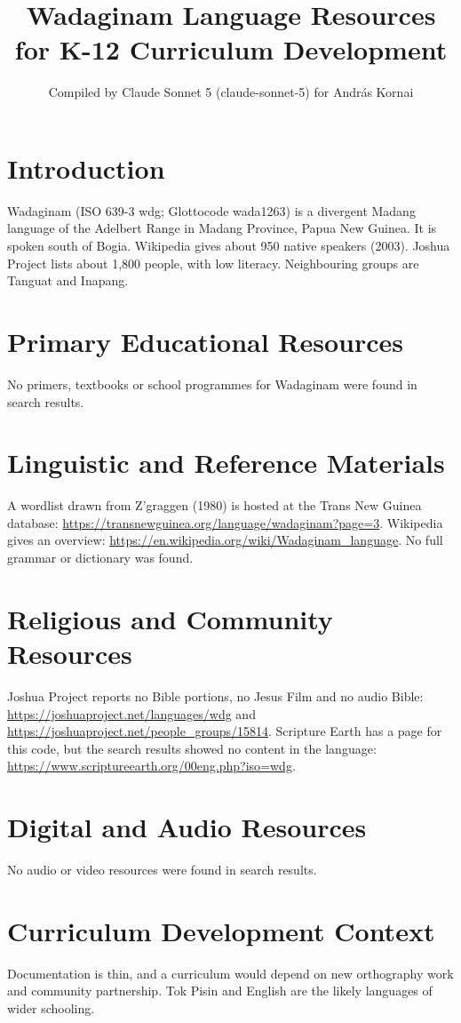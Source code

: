 \documentclass[12pt]{article}
\title{Wadaginam Language Resources for K-12 Curriculum Development}
\author{Compiled by Claude Sonnet 5 (claude-sonnet-5) for Andr\'as Kornai}
\date{}
\begin{document}
\maketitle

\section{Introduction}
Wadaginam (ISO 639-3 wdg; Glottocode wada1263) is a divergent Madang language of the Adelbert Range in Madang Province, Papua New Guinea. It is spoken south of Bogia. Wikipedia gives about 950 native speakers (2003). Joshua Project lists about 1,800 people, with low literacy. Neighbouring groups are Tanguat and Inapang.

\section{Primary Educational Resources}
No primers, textbooks or school programmes for Wadaginam were found in search results.

\section{Linguistic and Reference Materials}
A wordlist drawn from Z'graggen (1980) is hosted at the Trans New Guinea database: \url{https://transnewguinea.org/language/wadaginam?page=3}. Wikipedia gives an overview: \url{https://en.wikipedia.org/wiki/Wadaginam_language}. No full grammar or dictionary was found.

\section{Religious and Community Resources}
Joshua Project reports no Bible portions, no Jesus Film and no audio Bible: \url{https://joshuaproject.net/languages/wdg} and \url{https://joshuaproject.net/people_groups/15814}. Scripture Earth has a page for this code, but the search results showed no content in the language: \url{https://www.scriptureearth.org/00eng.php?iso=wdg}.

\section{Digital and Audio Resources}
No audio or video resources were found in search results.

\section{Curriculum Development Context}
Documentation is thin, and a curriculum would depend on new orthography work and community partnership. Tok Pisin and English are the likely languages of wider schooling.
\end{document}
